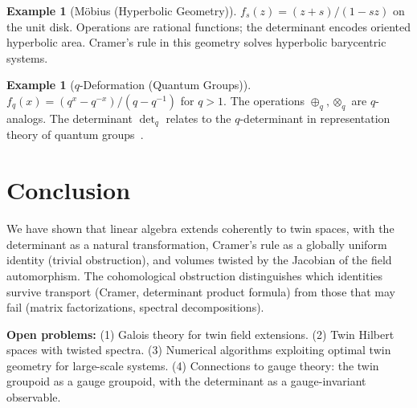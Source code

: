\documentclass[11pt,twocolumn]{article}
\theoremstyle{plain}
\theoremstyle{definition}
\newtheorem{example}[theorem]{Example}
\theoremstyle{remark}
\begin{document}
\begin{example}[M\"obius (Hyperbolic Geometry)]\label{ex:mobius}
$f_s(z) = (z + s)/(1 - sz)$ on the unit disk. Operations are rational functions; the determinant encodes oriented hyperbolic area. Cramer's rule in this geometry solves hyperbolic barycentric systems.
\end{example}

\begin{example}[$q$-Deformation (Quantum Groups)]\label{ex:q-deform}
$f_q(x) = (q^x - q^{-x})/(q - q^{-1})$ for $q > 1$. The operations $\oplus_q, \otimes_q$ are $q$-analogs. The determinant $\det_q$ relates to the $q$-determinant in representation theory of quantum groups~\cite{manin1988}.
\end{example}


\section{Conclusion}
\label{sec:conclusion}

We have shown that linear algebra extends coherently to twin spaces, with the determinant as a natural transformation, Cramer's rule as a globally uniform identity (trivial obstruction), and volumes twisted by the Jacobian of the field automorphism. The cohomological obstruction distinguishes which identities survive transport (Cramer, determinant product formula) from those that may fail (matrix factorizations, spectral decompositions).

\textbf{Open problems:} (1) Galois theory for twin field extensions. (2) Twin Hilbert spaces with twisted spectra. (3) Numerical algorithms exploiting optimal twin geometry for large-scale systems. (4) Connections to gauge theory: the twin groupoid as a gauge groupoid, with the determinant as a gauge-invariant observable.
\end{document}
